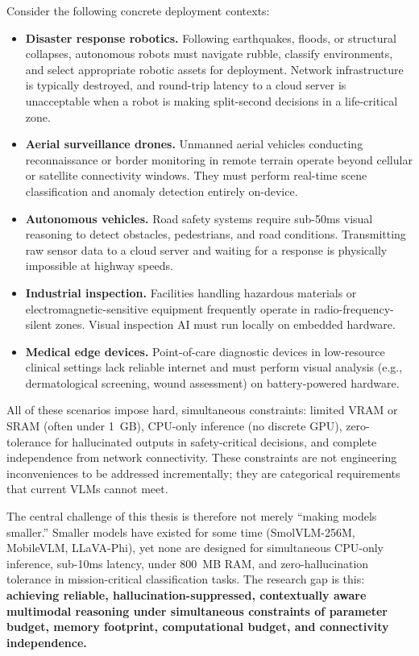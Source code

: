 Consider the following concrete deployment contexts:
\begin{itemize}
    \item \textbf{Disaster response robotics.} Following earthquakes, floods, or structural collapses, autonomous robots must navigate rubble, classify environments, and select appropriate robotic assets for deployment. Network infrastructure is typically destroyed, and round-trip latency to a cloud server is unacceptable when a robot is making split-second decisions in a life-critical zone.
    \item \textbf{Aerial surveillance drones.} Unmanned aerial vehicles conducting reconnaissance or border monitoring in remote terrain operate beyond cellular or satellite connectivity windows. They must perform real-time scene classification and anomaly detection entirely on-device.
    \item \textbf{Autonomous vehicles.} Road safety systems require sub-50ms visual reasoning to detect obstacles, pedestrians, and road conditions. Transmitting raw sensor data to a cloud server and waiting for a response is physically impossible at highway speeds.
    \item \textbf{Industrial inspection.} Facilities handling hazardous materials or electromagnetic-sensitive equipment frequently operate in radio-frequency-silent zones. Visual inspection AI must run locally on embedded hardware.
    \item \textbf{Medical edge devices.} Point-of-care diagnostic devices in low-resource clinical settings lack reliable internet and must perform visual analysis (e.g., dermatological screening, wound assessment) on battery-powered hardware.
\end{itemize}

All of these scenarios impose hard, simultaneous constraints: limited VRAM or SRAM (often under 1~GB), CPU-only inference (no discrete GPU), zero-tolerance for hallucinated outputs in safety-critical decisions, and complete independence from network connectivity. These constraints are not engineering inconveniences to be addressed incrementally; they are categorical requirements that current VLMs cannot meet.

The central challenge of this thesis is therefore not merely ``making models smaller.'' Smaller models have existed for some time (SmolVLM-256M, MobileVLM, LLaVA-Phi), yet none are designed for simultaneous CPU-only inference, sub-10ms latency, under 800~MB RAM, and zero-hallucination tolerance in mission-critical classification tasks. The research gap is this: \textbf{achieving reliable, hallucination-suppressed, contextually aware multimodal reasoning under simultaneous constraints of parameter budget, memory footprint, computational budget, and connectivity independence.}

